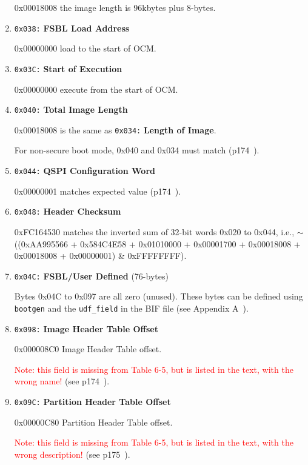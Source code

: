 \begin{enumerate}
0x00018008 the image length is 96kbytes plus 8-bytes.

\item \texttt{0x038:} \textbf{FSBL Load Address}

0x00000000 load to the start of OCM.

\item \texttt{0x03C:} \textbf{Start of Execution}

0x00000000 execute from the start of OCM.

\item \texttt{0x040:} \textbf{Total Image Length}

0x00018008 is the same as \texttt{0x034:} \textbf{Length of Image}.

For non-secure boot mode, 0x040 and 0x034 must match
(p174~\cite{Xilinx_UG585_2018}).

\item \texttt{0x044:} \textbf{QSPI Configuration Word}

0x00000001 matches expected value (p174~\cite{Xilinx_UG585_2018}).

\item \texttt{0x048:} \textbf{Header Checksum}

0xFC164530 matches the inverted sum of 32-bit words 0x020 to 0x044,
i.e., $\sim$((0xAA995566 + 0x584C4E58 + 0x01010000 + 0x00001700 + 0x00018008
+ 0x00018008 + 0x00000001) \& 0xFFFFFFFF).

\item \texttt{0x04C:} \textbf{FSBL/User Defined} (76-bytes)

Bytes 0x04C to 0x097 are all zero (unused). These bytes can be defined
using \verb+bootgen+ and the \verb+udf_field+ in the BIF file
(see Appendix A~\cite{Xilinx_UG821_2015}).

\item \texttt{0x098:} \textbf{Image Header Table Offset}

0x000008C0 Image Header Table offset.

\textcolor{red}{Note: this field is missing from Table 6-5, but is listed in
the text, with the wrong name!} (see p174~\cite{Xilinx_UG585_2018}).

\item \texttt{0x09C:} \textbf{Partition Header Table Offset}

0x00000C80 Partition Header Table offset.

\textcolor{red}{Note: this field is missing from Table 6-5, but is listed in
the text, with the wrong description!} (see p175~\cite{Xilinx_UG585_2018}).


\end{enumerate}
